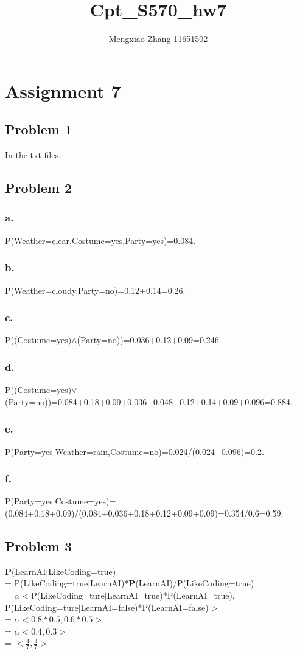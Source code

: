 \documentclass{article}
\author{Mengxiao Zhang-11651502}
\title{Cpt\_S570\_hw7}
\begin{document}
    \maketitle
    \section{Assignment 7}
        \subsection{Problem 1}
            In the txt files.
        \subsection{Problem 2}
            \subsubsection{a.}
                P(Weather=clear,Costume=yes,Party=yes)=0.084.
            \subsubsection{b.}
                P(Weather=cloudy,Party=no)=0.12+0.14=0.26.
            \subsubsection{c.}
                P((Costume=yes)$\wedge$(Party=no))=0.036+0.12+0.09=0.246.
            \subsubsection{d.}
                P((Costume=yes)$\vee$(Party=no))=0.084+0.18+0.09+0.036+0.048+0.12+0.14+0.09+0.096=0.884.
            \subsubsection{e.}
                P(Party=yes$|$Weather=rain,Costume=no)=0.024/(0.024+0.096)=0.2.
            \subsubsection{f.}
                P(Party=yes$|$Costume=yes)=(0.084+0.18+0.09)/(0.084+0.036+0.18+0.12+0.09+0.09)=0.354/0.6=0.59.
        \subsection{Problem 3}
            \textbf{P}(LearnAI$|$LikeCoding=true)
            \\ = P(LikeCoding=true$|$LearnAI)*\textbf{P}(LearnAI)/P(LikeCoding=true)
            \\ = $\alpha<$P(LikeCoding=ture$|$LearnAI=true)*P(LearnAI=true),\\P(LikeCoding=ture$|$LearnAI=false)*P(LearnAI=false)$>$
            \\ = $\alpha<0.8*0.5,0.6*0.5>$
            \\ = $\alpha<0.4,0.3>$
            \\ = $<\frac{4}{7},\frac{3}{7}>$
\end{document}
